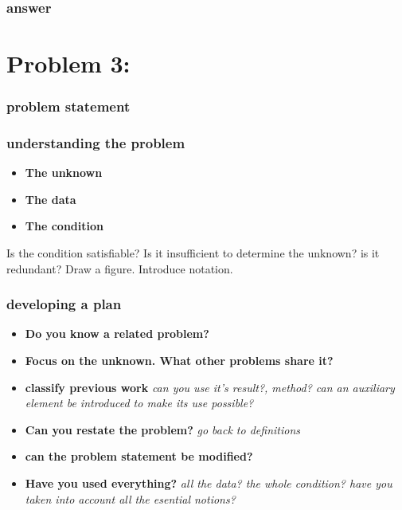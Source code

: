 \documentclass[11pt]{article}
\begin{document}
\subsubsection*{answer}

\section*{Problem 3:}

\subsubsection*{problem statement}

\subsubsection*{understanding the problem}

\begin{itemize}
 \item \textbf{The unknown}
 \item \textbf{The data} 
 \item \textbf{The condition} 
\end{itemize}

Is the condition satisfiable? Is it insufficient to determine the unknown? is it redundant?
Draw a figure. Introduce notation.

\subsubsection*{developing a plan}

\begin{itemize}
 \item \textbf{Do you know a related problem?}
 \item \textbf{Focus on the unknown. What other problems share it?}
 \item \textbf{classify previous work} \textit{can you use it's result?, method? can an auxiliary element be introduced to make its use possible?}
 \item \textbf{Can you restate the problem?} \textit{go back to definitions}
 \item \textbf{can the problem statement be modified?}
 \item \textbf{Have you used everything?} \textit{all the data? the whole condition? have you taken into account all the esential notions?}
\end{itemize}
\end{document}
